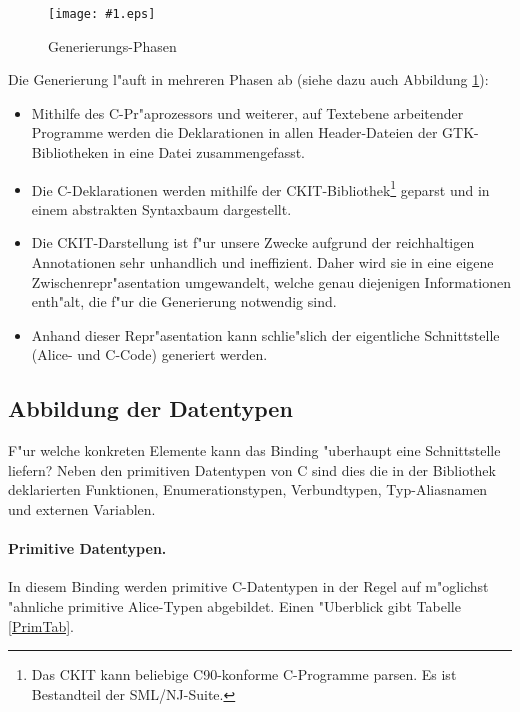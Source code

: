 \documentclass[a4paper,titlepage]{article}
\newcommand{\showimage}[1]{\begin{center}\texttt{[image: \#1.eps]}\end{center}}
\begin{document}
\begin{figure}
\showimage{generator}
\caption{Generierungs-Phasen}
\label{Generator}
\end{figure}
Die Generierung l"auft in mehreren Phasen ab (siehe dazu auch
Abbildung \ref{Generator}):
\begin{itemize}
\item Mithilfe des C-Pr"aprozessors und weiterer, auf Textebene arbeitender
      Programme werden die Deklarationen in allen
      Header-Dateien der GTK-Bibliotheken in eine Datei zusammengefasst.
\item Die C-Deklarationen werden mithilfe der
      CKIT-Bibliothek\footnote{Das CKIT \cite{ckit} kann beliebige C90-konforme
      C-Programme parsen. Es ist Bestandteil der SML/NJ-Suite.}
      geparst und in einem abstrakten Syntaxbaum dargestellt.
\item Die CKIT-Darstellung ist f"ur unsere Zwecke aufgrund der reichhaltigen
      Annotationen sehr unhandlich und ineffizient. Daher wird sie in eine
      eigene Zwischenrepr"asentation umgewandelt, welche genau diejenigen
      Informationen enth"alt, die f"ur die Generierung notwendig sind.
\item Anhand dieser Repr"asentation kann schlie"slich der eigentliche
      Schnittstelle (Alice- und C-Code) generiert werden.
\end{itemize}

\subsection{Abbildung der Datentypen}

F"ur welche konkreten Elemente kann das Binding "uberhaupt eine Schnittstelle
liefern? Neben den primitiven Datentypen von C sind dies die in der Bibliothek
deklarierten Funktionen, Enumerationstypen, Verbundtypen, Typ-Aliasnamen
und externen Variablen.

\paragraph{Primitive Datentypen.}

In diesem Binding werden primitive C-Datentypen in der Regel auf m"oglichst
"ahnliche primitive Alice-Typen abgebildet. Einen "Uberblick gibt
Tabelle \ref{PrimTab}.
\end{document}
